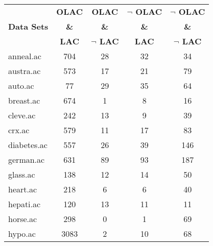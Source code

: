 \begin{table}[htbp]
	\centering
		\begin{tabular}{|l|c|c|c|c|}
		\hline
				& \textbf{OLAC}		& \textbf{OLAC}			& \textbf{$\neg$ OLAC}	& \textbf{$\neg$ OLAC}	\\
		\textbf{Data Sets}	& \textbf{\&}		& \textbf{\&}			& \textbf{\&}			& \textbf{\&}			\\
				& \textbf{LAC}		& \textbf{$\neg$ LAC}		& \textbf{LAC}			& \textbf{$\neg$ LAC}		\\
		\hline
		anneal.ac       & 704           & 28                 & 32                       & 34                            \\
		\hline
		austra.ac       & 573           & 17                 & 21                       & 79                            \\
		\hline
		auto.ac         & 77            & 29                 & 35                       & 64                            \\
		\hline
		breast.ac       & 674           & 1                  & 8                        & 16                            \\
		\hline
		cleve.ac        & 242           & 13                 & 9                        & 39                            \\
		\hline
		crx.ac          & 579           & 11                 & 17                       & 83                            \\
		\hline
		diabetes.ac     & 557           & 26                 & 39                       & 146                           \\
		\hline
		german.ac       & 631           & 89                 & 93                       & 187                           \\
		\hline
		glass.ac        & 138           & 12                 & 14                       & 50                            \\
		\hline
		heart.ac        & 218           & 6                  & 6                        & 40                            \\
		\hline
		hepati.ac       & 120           & 13                 & 11                       & 11                            \\
		\hline
		horse.ac        & 298           & 0                  & 1                        & 69                            \\
		\hline
		hypo.ac         & 3083          & 2                  & 10                       & 68                            \\

\end{tabular}
\end{table}
